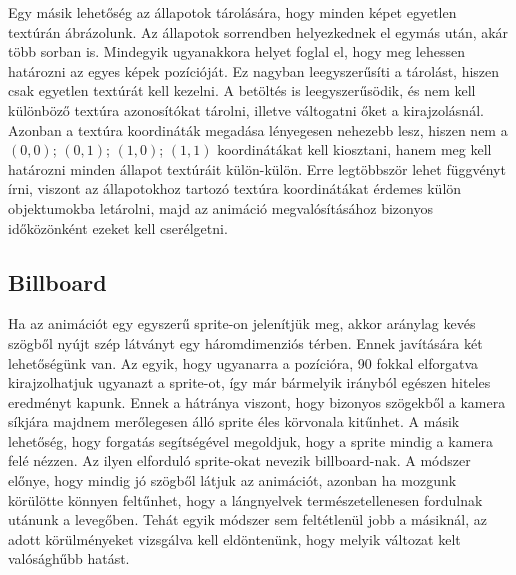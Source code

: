 Egy másik lehetőség az állapotok tárolására, hogy minden képet egyetlen textúrán ábrázolunk. Az állapotok sorrendben helyezkednek el egymás után, akár több sorban is. Mindegyik ugyanakkora helyet foglal el, hogy meg lehessen határozni az egyes képek pozícióját. Ez nagyban leegyszerűsíti a tárolást, hiszen csak egyetlen textúrát kell kezelni. A betöltés is leegyszerűsödik, és nem kell különböző textúra azonosítókat tárolni, illetve váltogatni őket a kirajzolásnál. Azonban a textúra koordináták megadása lényegesen nehezebb lesz, hiszen nem a $(0, 0)$; $(0, 1)$; $(1, 0)$; $(1, 1)$ koordinátákat kell kiosztani, hanem meg kell határozni minden állapot textúráit külön-külön. Erre legtöbbször lehet függvényt írni, viszont az állapotokhoz tartozó textúra koordinátákat érdemes külön objektumokba letárolni, majd az animáció megvalósításához bizonyos időközönként ezeket kell cserélgetni.

\subsection{Billboard}
Ha az animációt egy egyszerű sprite-on jelenítjük meg, akkor aránylag kevés szögből nyújt szép látványt egy háromdimenziós térben. Ennek javítására két lehetőségünk van. Az egyik, hogy ugyanarra a pozícióra, 90 fokkal elforgatva kirajzolhatjuk ugyanazt a sprite-ot, így már bármelyik irányból egészen hiteles eredményt kapunk. Ennek a hátránya viszont, hogy bizonyos szögekből a kamera síkjára majdnem merőlegesen álló sprite éles körvonala kitűnhet. A másik lehetőség, hogy forgatás segítségével megoldjuk, hogy a sprite mindig a kamera felé nézzen. Az ilyen elforduló sprite-okat nevezik billboard-nak. A módszer előnye, hogy mindig jó szögből látjuk az animációt, azonban ha mozgunk körülötte könnyen feltűnhet, hogy a lángnyelvek természetellenesen fordulnak utánunk a levegőben. Tehát egyik módszer sem feltétlenül jobb a másiknál, az adott körülményeket vizsgálva kell eldöntenünk, hogy melyik változat kelt valósághűbb hatást.

